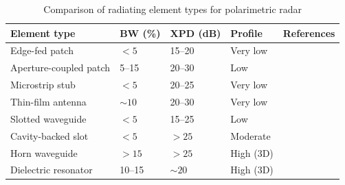 \begin{table}[ht]
    \centering
    \caption{Comparison of radiating element types for polarimetric radar}
    \label{tab:radiating_elements}
    \small
    \begin{tabular}{p{3.8cm} p{1.8cm} p{1.8cm} p{1.8cm} >{\footnotesize\raggedright\arraybackslash}p{3cm}}
        \toprule
        \textbf{Element type} & \textbf{BW (\%)} & \textbf{XPD (dB)} & \textbf{Profile} & {\small\textbf{References}} \\
        \midrule
        Edge-fed patch & $<5$ & 15--20 & Very low & \parencite{dashDesignSeriesFed2021,baur77GHzAutomotive2013,hambergerMixedCircularLinear2019} \\
        \addlinespace
        Aperture-coupled patch & 5--15 & 20--30 & Low & \parencite{acimovicDualPolarizedMicrostripPatch2008,puskely5GSIWBasedPhased2022,animHighGainMillimeterWavePatch2021,karamiDevelopingBroadbandMicrostrip2022a,saeidi-maneshLowCrossPolarizationHighIsolation2019} \\
        \addlinespace
        Microstrip stub & $<5$ & 20--25 & Very low & \parencite{tinti45degLinearlyPolarized2023,salucciSplineShapedMicrostripEdgeFed2024} \\
        \addlinespace
        Thin-film antenna & $\sim10$ & 20--30 & Very low & \parencite{khanHybridThinFilm2017} \\
        \addlinespace
        Slotted waveguide & $<5$ & 15--25 & Low & \parencite{hehenberger77GHzFMCWMIMO2020,bauer79GHzResonantLaminated2013} \\
        \addlinespace
        Cavity-backed slot & $<5$ & $>25$ & Moderate & \parencite{ferreiraCompactDualCircularlyPolarized2017,sunWidebandCavitySlottedWaveguide2024,mosalanejadMultiLayerPCBBowTie2020,liDesignImplementationSIW2019,yangMillimeterWaveDualPolarizedDifferentially2020} \\
        \addlinespace
        Horn waveguide & $>15$ & $>25$ & High (3D) & \parencite{trummerPerformanceAnalysis792017,tintiFullyPolarimetricAutomotive2024,zhaoSIWQuasiPyramidHorn2024} \\
        \addlinespace
        Dielectric resonator & 10--15 & $\sim20$ & High (3D) & \parencite{guoDualpolarizedDielectricResonator2003,kishkWidebandTruncatedTetrahedron2003} \\
        \bottomrule
    \end{tabular}
\end{table}

